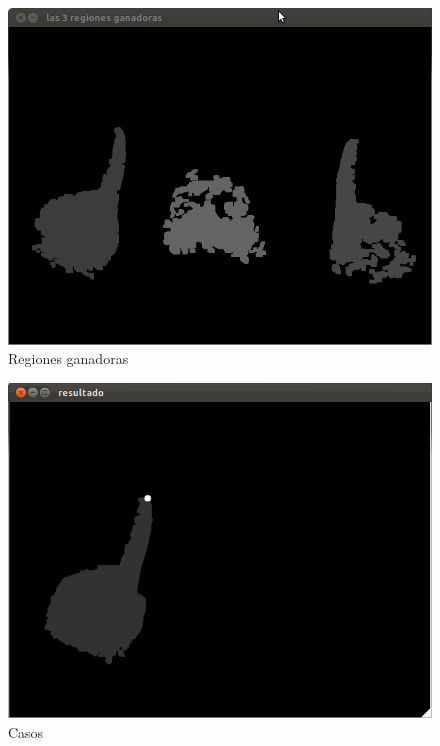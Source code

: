 \documentclass[conference,a4paper,10pt,oneside,final]{tfmpd}
\begin{document}
	\begin{figure}[tbhp]
	\centerline{\includegraphics[scale=0.2]{5_3_regiones_ganadoras}}
	\caption{Regiones ganadoras}
	\label{fig:ganadoras}
	\end{figure}
	
	
	\begin{figure}[tbhp]
	\centerline{\includegraphics[scale=0.2]{6_resultado_final}}
	\caption{Casos}
	\label{fig:casos}
	\end{figure}
	
\end{document}
